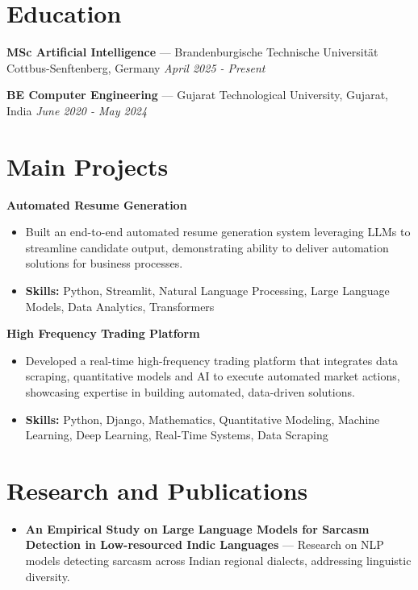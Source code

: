 \documentclass[a4paper,10pt]{article}
\begin{document}
\section*{Education}
\textbf{MSc Artificial Intelligence} — Brandenburgische Technische Universität Cottbus-Senftenberg, Germany \hfill \textit{April 2025 - Present}\par
\vspace{1.5pt}
\textbf{BE Computer Engineering} — Gujarat Technological University, Gujarat, India \hfill \textit{June 2020 - May 2024}\par

\section*{Main Projects}
\textbf{Automated Resume Generation}\par
\vspace{1pt}
\begin{itemize}
  \item Built an end-to-end automated resume generation system leveraging LLMs to streamline candidate output, demonstrating ability to deliver automation solutions for business processes.
  \item \textbf{Skills:} Python, Streamlit, Natural Language Processing, Large Language Models, Data Analytics, Transformers
\end{itemize}
\vspace{3pt}
\textbf{High Frequency Trading Platform}\par
\vspace{1pt}
\begin{itemize}
  \item Developed a real-time high-frequency trading platform that integrates data scraping, quantitative models and AI to execute automated market actions, showcasing expertise in building automated, data-driven solutions.
  \item \textbf{Skills:} Python, Django, Mathematics, Quantitative Modeling, Machine Learning, Deep Learning, Real-Time Systems, Data Scraping
\end{itemize}

\section*{Research and Publications}
\begin{itemize}
\item \textbf{An Empirical Study on Large Language Models for Sarcasm Detection in Low-resourced Indic Languages} — Research on NLP models detecting sarcasm across Indian regional dialects, addressing linguistic diversity.
\end{itemize}
\end{document}
